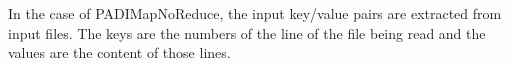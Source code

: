  In the case of PADIMapNoReduce, the input key/value pairs are extracted from input files. The keys are the numbers of the line of the file being read and the values are the content of those lines.





